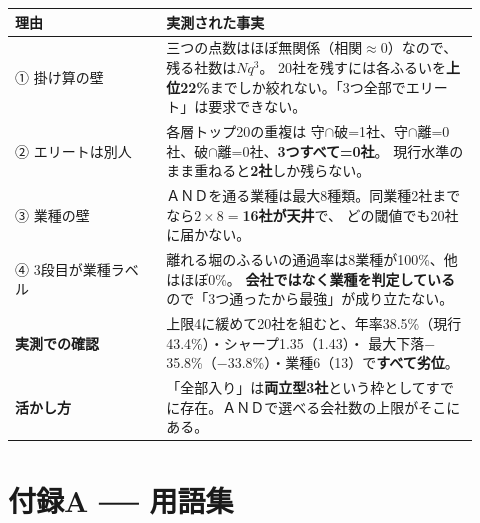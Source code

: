 \documentclass[a4paper,10.5pt]{article}
\begin{document}
\begin{center}
\small
\begin{tabular}{>{\raggedright\arraybackslash}p{0.30\linewidth}>{\raggedright\arraybackslash}p{0.62\linewidth}}
\toprule
\textbf{理由} & \textbf{実測された事実} \\
\midrule
① 掛け算の壁 &
三つの点数はほぼ無関係（相関$\approx$0）なので、残る社数は$N q^3$。
20社を残すには各ふるいを\textbf{上位22\%}までしか絞れない。「3つ全部でエリート」は要求できない。\\
\addlinespace
② エリートは別人 &
各層トップ20の重複は 守$\cap$破=1社、守$\cap$離=0社、破$\cap$離=0社、\textbf{3つすべて=0社}。
現行水準のまま重ねると\textbf{2社}しか残らない。\\
\addlinespace
③ 業種の壁 &
ＡＮＤを通る業種は最大8種類。同業種2社までなら$2\times8=$\textbf{16社が天井}で、
どの閾値でも20社に届かない。\\
\addlinespace
④ 3段目が業種ラベル &
離れる堀のふるいの通過率は8業種が100\%、他はほぼ0\%。
\textbf{会社ではなく業種を判定している}ので「3つ通ったから最強」が成り立たない。\\
\midrule
\textbf{実測での確認} &
上限4に緩めて20社を組むと、年率38.5\%（現行43.4\%）・シャープ1.35（1.43）・
最大下落$-$35.8\%（$-$33.8\%）・業種6（13）で\textbf{すべて劣位}。\\
\addlinespace
\textbf{活かし方} &
「全部入り」は\textbf{両立型3社}という枠としてすでに存在。ＡＮＤで選べる会社数の上限がそこにある。\\
\bottomrule
\end{tabular}
\end{center}

\appendix
\section{付録A ── 用語集}
\end{document}
